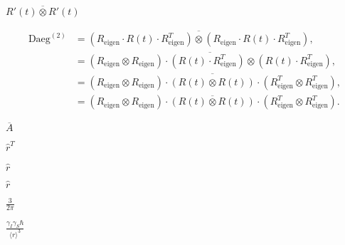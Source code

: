 \documentclass[a4paper,11pt,twoside,openright]{book}
\def\lthtmlcheckvsize{\ifdim\ht\sizebox<\vsize 
  \ifdim\wd\sizebox<\hsize\expandafter\hfill\fi \expandafter\vfill
  \else\expandafter\vss\fi}%
\begin{document}
{\newpage\clearpage
{}%
$\displaystyle \overline{{R'(t) \otimes R'(t)}}$%
\lthtmlindisplaymathZ
\lthtmlcheckvsize\clearpage}

{\newpage\clearpage
\setcounter{equation}{28}
%
\begin{subequations}\begin{align}
\textrm{Daeg}^{(2)}&= \overline{\left( R_{\textrm{eigen}} \cdot R(t) \cdot R_{\textrm{eigen}}^T \right) \otimes \left( R_{\textrm{eigen}} \cdot R(t) \cdot R_{\textrm{eigen}}^T \right)} , \\
&= \overline{\left(R_{\textrm{eigen}} \otimes R_{\textrm{eigen}} \right) \cdot \left( R(t) \cdot R_{\textrm{eigen}}^T \right) \otimes \left( R(t) \cdot R_{\textrm{eigen}}^T \right)} , \\
&= \overline{\left(R_{\textrm{eigen}} \otimes R_{\textrm{eigen}} \right) \cdot \left( R(t) \otimes R(t) \right) \cdot \left( R_{\textrm{eigen}}^T \otimes R_{\textrm{eigen}}^T \right)} , \\
&= \left(R_{\textrm{eigen}} \otimes R_{\textrm{eigen}} \right) \cdot \overline{\left( R(t) \otimes R(t) \right)} \cdot \left( R_{\textrm{eigen}}^T \otimes R_{\textrm{eigen}}^T \right) .
\end{align}\end{subequations}%
\lthtmldisplayZ
\lthtmlcheckvsize\clearpage}

{\newpage\clearpage
{}%
$ \overline{{A}}$%
\lthtmlindisplaymathZ
\lthtmlcheckvsize\clearpage}

{\newpage\clearpage
{}%
$\displaystyle \hat{{r}}^{T}_{}$%
\lthtmlindisplaymathZ
\lthtmlcheckvsize\clearpage}

{\newpage\clearpage
{}%
$\displaystyle \hat{{r}}$%
\lthtmlindisplaymathZ
\lthtmlcheckvsize\clearpage}

{\newpage\clearpage
{}%
$ \hat{{r}}$%
\lthtmlindisplaymathZ
\lthtmlcheckvsize\clearpage}

{\newpage\clearpage
{}%
$\displaystyle {\frac{{3}}{{2\pi}}}$%
\lthtmlindisplaymathZ
\lthtmlcheckvsize\clearpage}

{\newpage\clearpage
{}%
$\displaystyle {\frac{{\gamma_I \gamma_S \hbar}}{{\langle r \rangle^3}}}$%
\lthtmlindisplaymathZ
\lthtmlcheckvsize\clearpage}
\end{document}
